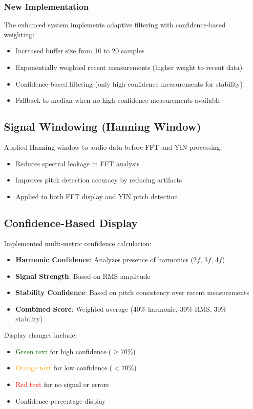 \documentclass[11pt,a4paper]{article}
\begin{document}
\subsubsection{New Implementation}
The enhanced system implements adaptive filtering with confidence-based weighting:
\begin{itemize}
    \item Increased buffer size from 10 to 20 samples
    \item Exponentially weighted recent measurements (higher weight to recent data)
    \item Confidence-based filtering (only high-confidence measurements for stability)
    \item Fallback to median when no high-confidence measurements available
\end{itemize}

\subsection{Signal Windowing (Hanning Window)}

Applied Hanning window to audio data before FFT and YIN processing:
\begin{itemize}
    \item Reduces spectral leakage in FFT analysis
    \item Improves pitch detection accuracy by reducing artifacts
    \item Applied to both FFT display and YIN pitch detection
\end{itemize}

\subsection{Confidence-Based Display}

Implemented multi-metric confidence calculation:
\begin{itemize}
    \item \textbf{Harmonic Confidence}: Analyzes presence of harmonics (2$f$, 3$f$, 4$f$)
    \item \textbf{Signal Strength}: Based on RMS amplitude
    \item \textbf{Stability Confidence}: Based on pitch consistency over recent measurements
    \item \textbf{Combined Score}: Weighted average (40\% harmonic, 30\% RMS, 30\% stability)
\end{itemize}

Display changes include:
\begin{itemize}
    \item \textcolor{darkgreen}{Green text} for high confidence ($\geq$70\%)
    \item \textcolor{orange}{Orange text} for low confidence ($<$70\%)
    \item \textcolor{red}{Red text} for no signal or errors
    \item Confidence percentage display
\end{itemize}
\end{document}

